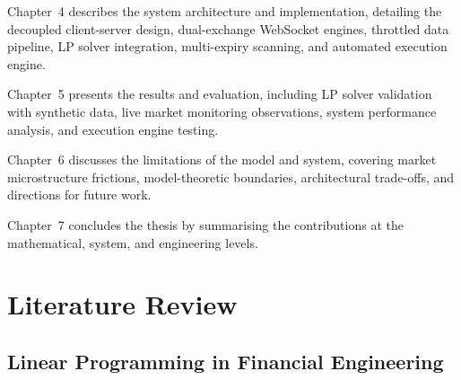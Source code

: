 \documentclass[openany]{book}
\numberwithin{figure}{chapter}
\numberwithin{equation}{chapter}
\begin{document}
Chapter~4 describes the system architecture and implementation, detailing the decoupled client-server design, dual-exchange WebSocket engines, throttled data pipeline, LP solver integration, multi-expiry scanning, and automated execution engine.

Chapter~5 presents the results and evaluation, including LP solver validation with synthetic data, live market monitoring observations, system performance analysis, and execution engine testing.

Chapter~6 discusses the limitations of the model and system, covering market microstructure frictions, model-theoretic boundaries, architectural trade-offs, and directions for future work.

Chapter~7 concludes the thesis by summarising the contributions at the mathematical, system, and engineering levels.

\chapter{Literature Review}
%

\section{Linear Programming in Financial Engineering}
\end{document}
